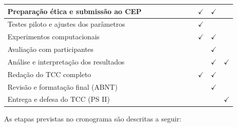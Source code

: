 \begin{table}[htb]
\begin{tabularx}{\textwidth}{|X|c|c|c|c|c|c|c|c|c|c|}
  Preparação ética e submissão ao CEP
  & & & & & & & & $\checkmark$ & $\checkmark$ & \\
  \hline

  Testes piloto e ajustes dos parâmetros
  & & & & & & & & $\checkmark$ & & \\
  \hline

  Experimentos computacionais
  & & & & & & & & $\checkmark$ & $\checkmark$ & \\
  \hline

  Avaliação com participantes
  & & & & & & & & & $\checkmark$ & \\
  \hline

  Análise e interpretação dos resultados
  & & & & & & & & & $\checkmark$ & $\checkmark$ \\
  \hline

  Redação do TCC completo
  & & & & & & & & $\checkmark$ & $\checkmark$ & \\
  \hline

  Revisão e formatação final (ABNT)
  & & & & & & & & & $\checkmark$ & \\
  \hline

  Entrega e defesa do TCC (PS II)
  & & & & & & & & & & $\checkmark$ \\
  \hline

\end{tabularx}

\end{table}

As etapas previstas no cronograma são descritas a seguir:


